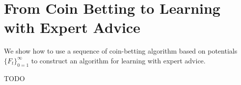 \section{From Coin Betting to Learning with Expert Advice}

We show how to use a sequence of coin-betting algorithm based on potentials
$\{F_t\}_{0=1}^\infty$ to construct an algorithm for learning with expert
advice.

TODO
